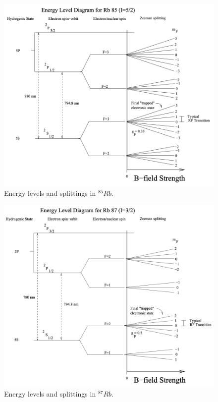 \documentclass[%
 aip,
rsi,%
 amsmath,amssymb,
 reprint,%
author-numerical,%
]{revtex4-1}
\begin{document}
\begin{figure}[H]
\includegraphics[width=1\linewidth]{lateximages/Rb85structure.png} 
\caption{\label{fig:Rb85structure}  Energy levels and splittings in $^{85}Rb$. }
\end{figure}

\begin{figure}[H]
\center
\includegraphics[width=1\linewidth]{lateximages/Rb87structure.png}
\caption{\label{fig:Rb87structure}  Energy levels and splittings in $^{87}Rb$. }
\end{figure}
\end{document}
